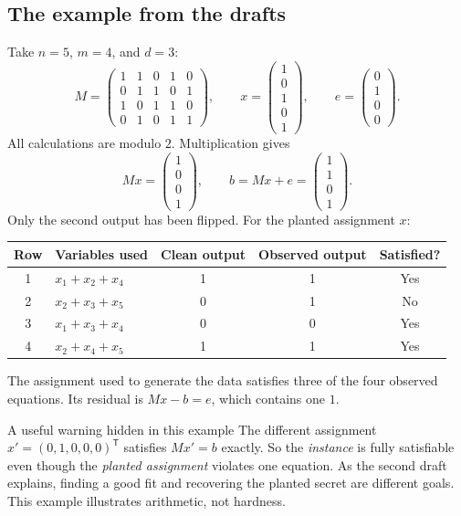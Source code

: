 \documentclass[11pt,a4paper]{article}
\begin{document}
\subsection*{The example from the drafts}
Take $n=5$, $m=4$, and $d=3$:
\[
M=\begin{pmatrix}
1&1&0&1&0\\
0&1&1&0&1\\
1&0&1&1&0\\
0&1&0&1&1
\end{pmatrix},\qquad
x=\begin{pmatrix}1\\0\\1\\0\\1\end{pmatrix},\qquad
e=\begin{pmatrix}0\\1\\0\\0\end{pmatrix}.
\]
All calculations are modulo $2$. Multiplication gives
\[
Mx=\begin{pmatrix}1\\0\\0\\1\end{pmatrix},
\qquad
b=Mx+e=\begin{pmatrix}1\\1\\0\\1\end{pmatrix}.
\]
Only the second output has been flipped. For the planted assignment $x$:
\begin{center}
\begin{tabular}{@{}clccc@{}}
\toprule
Row & Variables used & Clean output & Observed output & Satisfied?\\
\midrule
1 & $x_1+x_2+x_4$ & 1 & 1 & Yes\\
2 & $x_2+x_3+x_5$ & 0 & 1 & No\\
3 & $x_1+x_3+x_4$ & 0 & 0 & Yes\\
4 & $x_2+x_4+x_5$ & 1 & 1 & Yes\\
\bottomrule
\end{tabular}
\end{center}
The assignment used to generate the data satisfies three of the four observed equations. Its residual is $Mx-b=e$, which contains one $1$.~\cite{draft1}

\begin{keyidea}{A useful warning hidden in this example}
The different assignment $x'=(0,1,0,0,0)^{\mathsf T}$ satisfies $Mx'=b$ exactly. So the \emph{instance} is fully satisfiable even though the \emph{planted assignment} violates one equation. As the second draft explains, finding a good fit and recovering the planted secret are different goals. This example illustrates arithmetic, not hardness.~\cite{draft2}
\end{keyidea}
\end{document}
